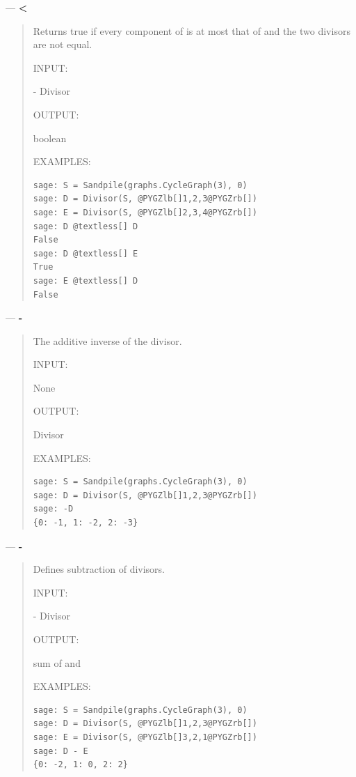 \documentclass[letterpaper,10pt,english]{manual}
\begin{document}
---
\hypertarget{less-divisor}{}
\textbf{\textless{}}
\begin{quote}

Returns true if every component of  is at most that
of  and the two divisors are not equal.

INPUT:

 - Divisor

OUTPUT:

boolean

EXAMPLES:

\begin{Verbatim}[commandchars=@\[\]]
sage: S = Sandpile(graphs.CycleGraph(3), 0)
sage: D = Divisor(S, @PYGZlb[]1,2,3@PYGZrb[])
sage: E = Divisor(S, @PYGZlb[]2,3,4@PYGZrb[])
sage: D @textless[] D
False
sage: D @textless[] E
True
sage: E @textless[] D
False
\end{Verbatim}
\end{quote}

---
\hypertarget{neg-divisor}{}
\textbf{-}
\begin{quote}

The additive inverse of the divisor.

INPUT:

None

OUTPUT:

Divisor

EXAMPLES:

\begin{Verbatim}[commandchars=@\[\]]
sage: S = Sandpile(graphs.CycleGraph(3), 0)
sage: D = Divisor(S, @PYGZlb[]1,2,3@PYGZrb[])
sage: -D
{0: -1, 1: -2, 2: -3}
\end{Verbatim}
\end{quote}

---
\hypertarget{sub-divisor}{}
\textbf{-}
\begin{quote}

Defines subtraction of divisors.

INPUT:

 - Divisor

OUTPUT:

sum of  and 

EXAMPLES:

\begin{Verbatim}[commandchars=@\[\]]
sage: S = Sandpile(graphs.CycleGraph(3), 0)
sage: D = Divisor(S, @PYGZlb[]1,2,3@PYGZrb[])
sage: E = Divisor(S, @PYGZlb[]3,2,1@PYGZrb[])
sage: D - E
{0: -2, 1: 0, 2: 2}
\end{Verbatim}
\end{quote}
\end{document}
